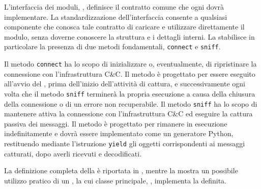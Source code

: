 
L'interfaccia dei moduli, \interface{}, definisce il contratto comune che ogni \capture{} dovrà implementare. La standardizzazione dell'interfaccia consente a qualsiasi componente che conosca tale contratto di caricare e utilizzare direttamente il modulo, senza doverne conoscere la struttura e i dettagli interni. La \interface{} stabilisce in particolare la presenza di due metodi fondamentali, \texttt{connect} e \texttt{sniff}.

Il metodo \texttt{connect} ha lo scopo di inizializzare o, eventualmente, di ripristinare la connessione con l'infrastruttura C\&C. Il metodo è progettato per essere eseguito all'avvio del \capture{}, prima dell'inizio dell'attività di cattura, e successivamente ogni volta che il metodo \texttt{sniff} terminerà la propria esecuzione a causa della chiusura della connessione o di un errore non recuperabile. Il metodo \texttt{sniff} ha lo scopo di mantenere attiva la connessione con l'infrastruttura C\&C ed eseguire la cattura passiva dei messaggi. Il metodo è progettato per rimanere in esecuzione indefinitamente e dovrà essere implementato come un generatore Python, restituendo mediante l'istruzione \texttt{yield} gli oggetti corrispondenti ai messaggi catturati, dopo averli ricevuti e decodificati.

La definizione completa della \interface{} è riportata in , mentre la  mostra un possibile utilizzo pratico di un \capture{}, la cui classe principale, \botnet{}, implementa la \interface{} definita.

